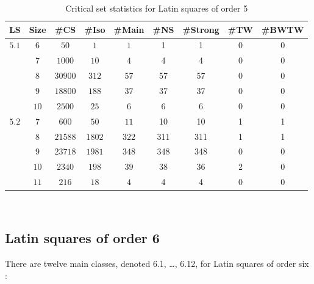 \begin{table}
\begin{center}
\caption{Critical set statistics for Latin squares of order 5}
\label{three}
\begin{tabular}{|c|c|c|c|c|c|c|c|c|} \hline
 LS & Size & \#CS &
\#Iso & \#Main & \#NS & \#Strong & \#TW & \#BWTW \\ \hline
$5.1$ & $6$  & $50$    & $1$    & $1$ & 1 & 1 & 0 & 0 \\
      & $7$  & $1000$  & $10$   & $4$ & 4 & 4  & 0 & 0 \\
      & $8$  & $30900$ & $312$  & $57$ & 57 & 57 & 0 & 0 \\
      & $9$  & $18800$ & $188$  & $37$ & 37 & 37 & 0 & 0 \\
      & $10$ & $2500$  & $25$   & $6$ & 6 & 6 & 0 & 0 \\ \hline
$5.2$ & $7$  & $600$   & $50$   & $11$ & 10 & 10 & 1 & 1 \\
      & $8$  & $21588$ & $1802$ & $322$ & 311 & 311 & 1 & 1 \\
      & $9$  & $23718$ & $1981$ & $348$ & 348 & 348 & 0 & 0 \\
      & $10$ & $2340$  & $198$  & $39$ & 38 & 36 & 2 & 0 \\
      & $11$ & $216$   & $18$   & $4$ & 4 & 4 & 0 & 0 \\ \hline
\end{tabular}\vspace {3mm} \\
\end{center}
\end{table}

\subsection{Latin squares of order 6}

There are twelve main classes, denoted 6.1, \dots, 6.12, for Latin squares of 
order six \cite{crc}:

